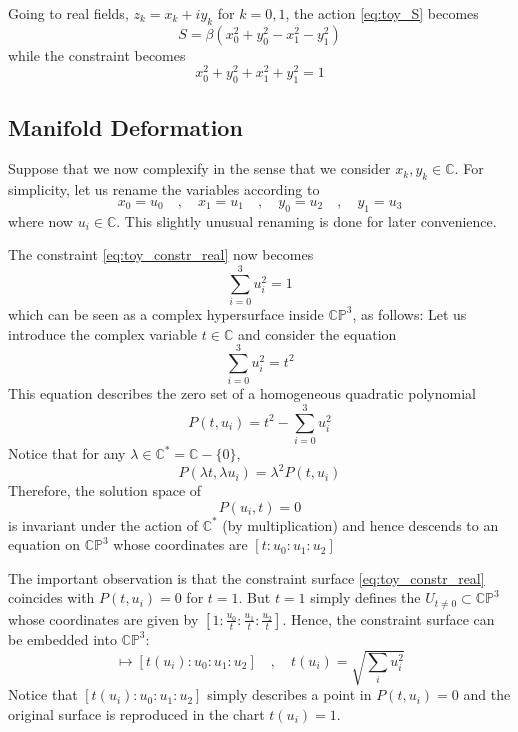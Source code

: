 \documentclass[a4paper,11pt]{article}
\newcommand{\CC}{\mathbb{C}}
\newcommand{\CP}{\mathbb{CP}}
\begin{document}
Going to real fields, $z_k = x_k + i y_k$ for $k = 0,1$, the action \eqref{eq:toy_S} becomes 
\begin{equation}
  S = \beta\left( x_0^2 + y_0^2 - x_1^2 - y_1^2 \right)
  \label{eq:toy_S_real}
\end{equation}
while the constraint becomes
\begin{equation}
  x_0^2 + y_0^2 + x_1^2 + y_1^2 = 1
  \label{eq:toy_constr_real}
\end{equation}

\subsection{Manifold Deformation}
Suppose that we now complexify in the sense that we consider $x_k, y_k \in \CC$.
For simplicity, let us rename the variables according to 
\begin{equation}
  x_0 = u_0 \quad , \quad x_1 = u_1 \quad , \quad  y_0 = u_2 \quad , \quad y_1 = u_3
\end{equation}
where now $u_i \in \CC$.
This slightly unusual renaming is done for later convenience.

The constraint \eqref{eq:toy_constr_real} now becomes
\begin{equation}
  \sum_{i=0}^3 u_i^2 = 1
\end{equation}
which can be seen as a complex hypersurface inside $\CP^3$, as follows: Let us introduce the complex variable $t \in \CC$ and consider the equation 
\begin{equation}
  \sum_{i=0}^3 u_i^2 = t^2
\end{equation}
This equation describes the zero set of a homogeneous quadratic polynomial 
\begin{equation}
  P(t,u_i) = t^2 - \sum_{i=0}^3 u_i^2
\end{equation}
Notice that for any $\lambda \in \CC^* = \CC - \{ 0 \}$,
\begin{equation}
  P(\lambda t, \lambda u_i) = \lambda^2 P(t,u_i)
\end{equation}
Therefore, the solution space of 
\begin{equation}
  P(u_i,t) = 0
\end{equation}
is invariant under the action of $\CC^*$ (by multiplication) and hence descends to an equation on $\CP^3$ whose coordinates are $[t:u_0:u_1:u_2]$

The important observation is that the constraint surface \eqref{eq:toy_constr_real} coincides with $P(t,u_i) = 0$ for $t=1$.
But $t=1$ simply defines the $U_{t \neq 0} \subset \CP^3$ whose coordinates are given by $\left[ 1:\tfrac{u_0}{t}:\tfrac{u_1}{t}:\tfrac{u_2}{t}\right]$.
Hence, the constraint surface can be embedded into $\CP^3$:
\begin{equation}
  [u_0:u_1:u_2] \mapsto [t(u_i):u_0:u_1:u_2] \quad , \quad t(u_i) = \sqrt{\sum_i u_i^2} 
  \label{eq:toy_emb}
\end{equation}
Notice that $[t(u_i):u_0:u_1:u_2]$ simply describes a point in $P(t,u_i) = 0$ and the original surface is reproduced in the chart $t(u_i) = 1$.  
\end{document}
